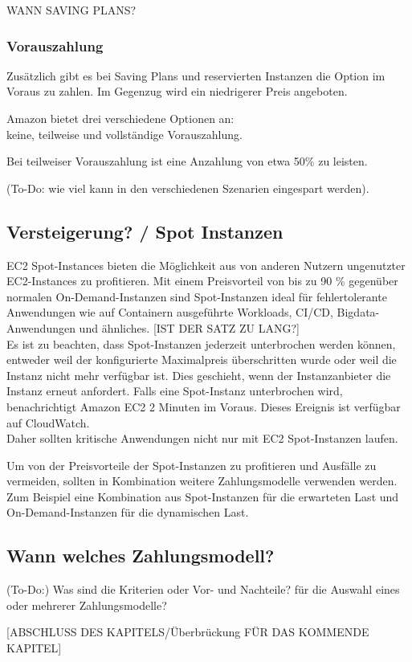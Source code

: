 WANN SAVING PLANS? 

\subsubsection{Vorauszahlung}
Zusätzlich gibt es bei Saving Plans und reservierten Instanzen die Option im Voraus zu zahlen.
Im Gegenzug wird ein niedrigerer Preis angeboten.

Amazon bietet drei verschiedene Optionen an:\\ 
keine, teilweise und vollständige Vorauszahlung.

Bei teilweiser Vorauszahlung ist eine Anzahlung von etwa 50\% zu leisten.

(To-Do: wie viel kann in den verschiedenen Szenarien eingespart werden).

\subsection{Versteigerung? / Spot Instanzen }
EC2 Spot-Instances bieten die Möglichkeit aus von anderen Nutzern ungenutzter EC2-Instances zu profitieren.
Mit einem Preisvorteil von bis zu 90 \% gegenüber normalen On-Demand-Instanzen sind Spot-Instanzen ideal für fehlertolerante Anwendungen wie auf Containern ausgeführte Workloads, CI/CD, Bigdata-Anwendungen und ähnliches.
[IST DER SATZ ZU LANG?]
\\
Es ist zu beachten, dass Spot-Instanzen jederzeit unterbrochen werden können, entweder weil der konfigurierte Maximalpreis überschritten wurde oder weil die Instanz nicht mehr verfügbar ist. Dies geschieht, wenn der Instanzanbieter die Instanz erneut anfordert. Falls eine Spot-Instanz unterbrochen wird, benachrichtigt Amazon EC2 2 Minuten im Voraus. Dieses Ereignis ist verfügbar auf CloudWatch.
\\
Daher sollten kritische Anwendungen nicht nur mit EC2 Spot-Instanzen laufen.

Um von der Preisvorteile der Spot-Instanzen zu profitieren und Ausfälle zu vermeiden, sollten in Kombination weitere Zahlungsmodelle verwenden werden.
\\
Zum Beispiel eine Kombination aus Spot-Instanzen für die erwarteten Last und On-Demand-Instanzen für die dynamischen Last.


\subsection{Wann welches Zahlungsmodell?}
(To-Do:) Was sind die Kriterien oder Vor- und Nachteile? für die Auswahl eines oder mehrerer Zahlungsmodelle?




[ABSCHLUSS DES KAPITELS/Überbrückung FÜR DAS KOMMENDE KAPITEL]